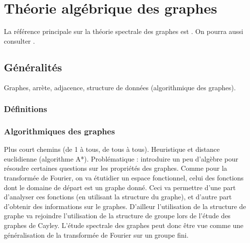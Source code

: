 
\chapter{Théorie algébrique des graphes}
\thispagestyle{empty}
\label{chap-theorie-algebrique-graphes} 

La référence principale sur la théorie spectrale des graphes est \cite{chung-spectral}. On pourra aussi consulter \cite{terras}.
\section{Généralités}
\label{sect1-theorie-graphes-généralites} 

Graphes, arrète, adjacence, structure de données (algorithmique des graphes).
\subsection{Définitions}
\label{sect2-theorie-alg-graphes-dfn} 


\subsection{Algorithmiques des graphes}
\label{sect2-algorithmique-graphes} 

Plus court chemins (de 1 à tous, de tous à tous). Heuristique et distance euclidienne (algorithme A*). Problématique : introduire un peu d'algèbre pour résoudre certaines questions sur les propriétés des graphes. Comme pour la transformée de Fourier, on va étutidier un espace fonctionnel, celui des fonctions dont le domaine de départ est un graphe donné. Ceci va permettre d'une part d'analyser ces fonctions (en utilisant la structure du graphe), et d'autre part d'obtenir des informations sur le graphes. D'ailleur l'utilisation de la structure de graphe va rejoindre l'utilisation de la structure de groupe lors de l'étude des graphes de Cayley. L'étude spectrale des graphes peut donc être vue comme une généralisation de la transformée de Fourier sur un groupe fini.
